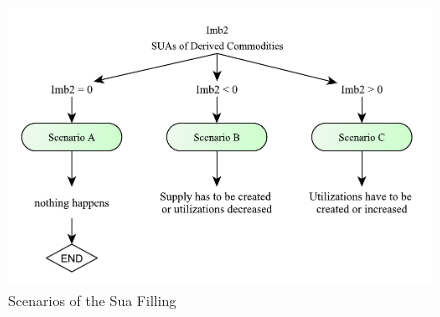 \documentclass[]{article}
\begin{document}
\begin{figure}

{\centering \includegraphics[width=0.8\linewidth]{images/StandBal/05_ScenariosFilling} 

}

\caption{\label{fig:f5}Scenarios of the Sua Filling}\label{fig:f5}
\end{figure}
\end{document}
